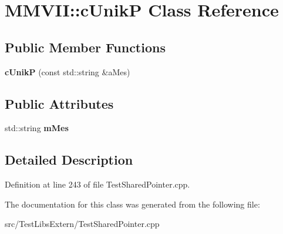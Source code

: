 \hypertarget{classMMVII_1_1cUnikP}{}\section{M\+M\+V\+II\+:\+:c\+UnikP Class Reference}
\label{classMMVII_1_1cUnikP}
\subsection*{Public Member Functions}
\begin{DoxyCompactItemize}
\item 
{\bfseries c\+UnikP} (const std\+::string \&a\+Mes)\hypertarget{classMMVII_1_1cUnikP_a68d9c86dabdc8d6abeb1e38a015069da}{}\label{classMMVII_1_1cUnikP_a68d9c86dabdc8d6abeb1e38a015069da}

\end{DoxyCompactItemize}
\subsection*{Public Attributes}
\begin{DoxyCompactItemize}
\item 
std\+::string {\bfseries m\+Mes}\hypertarget{classMMVII_1_1cUnikP_a7876e890a739fb0202e8d0548667447d}{}\label{classMMVII_1_1cUnikP_a7876e890a739fb0202e8d0548667447d}

\end{DoxyCompactItemize}


\subsection{Detailed Description}


Definition at line 243 of file Test\+Shared\+Pointer.\+cpp.



The documentation for this class was generated from the following file\+:\begin{DoxyCompactItemize}
\item 
src/\+Test\+Libs\+Extern/Test\+Shared\+Pointer.\+cpp\end{DoxyCompactItemize}
